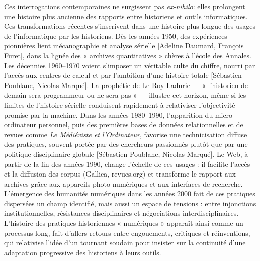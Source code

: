 Ces interrogations contemporaines ne surgissent pas \emph{ex-nihilo}: elles prolongent une histoire plus ancienne des rapports entre historiens et outils informatiques. Ces transformations récentes s’inscrivent dans une histoire plus longue des usages de l’informatique par les historiens. Dès les années 1950, des expériences pionnières lient mécanographie et analyse sérielle [Adeline Daumard, François Furet], dans la lignée des « archives quantitatives » chères à l’école des Annales. Les décennies 1960–1970 voient s’imposer un véritable culte du chiffre, nourri par l’accès aux centres de calcul et par l’ambition d’une histoire totale [Sébastien Poublanc, Nicolas Marqué]. La prophétie de Le Roy Ladurie — « l’historien de demain sera programmeur ou ne sera pas » — illustre cet horizon, même si les limites de l’histoire sérielle conduisent rapidement à relativiser l’objectivité promise par la machine. Dans les années 1980–1990, l’apparition du micro-ordinateur personnel, puis des premières bases de données relationnelles et de revues comme \emph{Le Médiéviste et l’Ordinateur}, favorise une technicisation diffuse des pratiques, souvent portée par des chercheurs passionnés plutôt que par une politique disciplinaire globale [Sébastien Poublanc, Nicolas Marqué]. Le Web, à partir de la fin des années 1990, change l’échelle de ces usages : il facilite l’accès et la diffusion des corpus (Gallica, revues.org) et transforme le rapport aux archives grâce aux appareils photo numériques et aux interfaces de recherche. L’émergence des humanités numériques dans les années 2000 fait de ces pratiques dispersées un champ identifié, mais aussi un espace de tensions : entre injonctions institutionnelles, résistances disciplinaires et négociations interdisciplinaires. L’histoire des pratiques historiennes « numériques » apparaît ainsi comme un processus long, fait d’allers-retours entre engouements, critiques et réinventions, qui relativise l’idée d’un tournant soudain pour insister sur la continuité d’une adaptation progressive des historiens à leurs outils.

